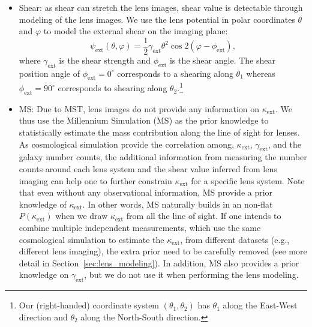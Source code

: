 \documentclass[useAMS,usenatbib]{mnras}
\newcommand{\sref}[1]{Section~\ref{#1}}
\begin{document}
\begin{itemize}
    \item \textsf{Shear:} as shear can stretch the lens images, shear value is detectable through modeling of the lens images. We use the lens potential in polar coordinates $\theta$ and $\varphi$ to model the external shear on the imaging plane: 
    \begin{equation}
    \label{eq:arclight0}
    \psi_{\text{ext}}(\theta, \varphi)=\frac{1}{2}\gamma_{\text{ext}}\theta^{2}\cos2(\varphi-\phi_{\text{ext}}),
    \end{equation}
    where $\gamma_{\text{ext}}$ is the shear strength and $\phi_{\text{ext}}$ is the shear angle. The shear position angle of $\phi_{\text{ext}}=0^{\circ}$ corresponds to a shearing along $\theta_{1}$ whereas $\phi_{\text{ext}}=90^{\circ}$ corresponds to shearing along $\theta_{2}$.\footnote{Our (right-handed) coordinate system $(\theta_{1},\theta_2)$ has $\theta_1$ along the East-West direction and $\theta_2$ along the North-South direction.}
    \item \textsf{MS:} Due to MST, lens images do not provide any information on $\kappa_{\textrm{ext}}$. 
    We thus use the Millennium Simulation (MS) as the prior knowledge to statistically estimate the mass contribution along the line of sight for lenses.
    As cosmological simulation provide the correlation among, $\kappa_{\textrm{ext}}$, $\gamma_{\textrm{ext}}$, and the galaxy number counts, the additional information from measuring the number counts around each lens system and the shear value inferred from lens imaging can help one to further constrain $\kappa_{\textrm{ext}}$ for a specific lens system. 
    Note that even without any observational information, MS provide a prior knowledge of $\kappa_{\textrm{ext}}$. 
    In other words, MS naturally builds in an non-flat $P(\kappa_{\textrm{ext}})$ when we draw $\kappa_{\textrm{ext}}$ from all the line of sight. 
    If one intends to combine multiple independent measurements, which use the same cosmological simulation to estimate the $\kappa_{\textrm{ext}}$, from different datasets (e.g., different lens imaging), the extra prior need to be carefully removed (see more detail in \sref{sec:lens_modeling}). 
    In addition, MS also provides a prior knowledge on $\gamma_{\textrm{ext}}$, but we do not use it when performing the lens modeling.
\end{itemize}
\end{document}
